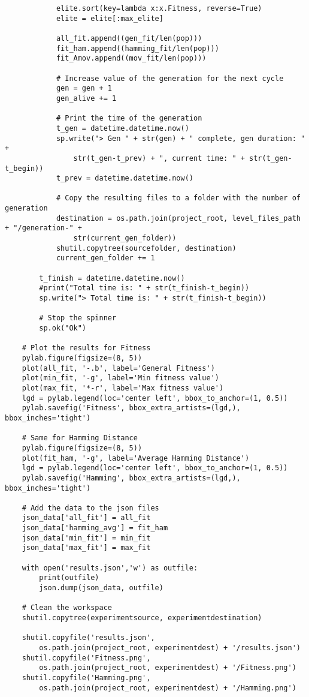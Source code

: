 \begin{verbatim}
            elite.sort(key=lambda x:x.Fitness, reverse=True)
            elite = elite[:max_elite]

            all_fit.append((gen_fit/len(pop)))
            fit_ham.append((hamming_fit/len(pop)))
            fit_Amov.append((mov_fit/len(pop)))
            
            # Increase value of the generation for the next cycle
            gen = gen + 1
            gen_alive += 1

            # Print the time of the generation
            t_gen = datetime.datetime.now()
            sp.write("> Gen " + str(gen) + " complete, gen duration: " + 
                str(t_gen-t_prev) + ", current time: " + str(t_gen-t_begin))
            t_prev = datetime.datetime.now()

            # Copy the resulting files to a folder with the number of generation
            destination = os.path.join(project_root, level_files_path + "/generation-" + 
                str(current_gen_folder))
            shutil.copytree(sourcefolder, destination)
            current_gen_folder += 1

        t_finish = datetime.datetime.now()
        #print("Total time is: " + str(t_finish-t_begin))
        sp.write("> Total time is: " + str(t_finish-t_begin))

        # Stop the spinner
        sp.ok("Ok")
        
    # Plot the results for Fitness
    pylab.figure(figsize=(8, 5))
    plot(all_fit, '-.b', label='General Fitness')
    plot(min_fit, '-g', label='Min fitness value')
    plot(max_fit, '*-r', label='Max fitness value')
    lgd = pylab.legend(loc='center left', bbox_to_anchor=(1, 0.5))
    pylab.savefig('Fitness', bbox_extra_artists=(lgd,), bbox_inches='tight')

    # Same for Hamming Distance
    pylab.figure(figsize=(8, 5))
    plot(fit_ham, '-g', label='Average Hamming Distance')
    lgd = pylab.legend(loc='center left', bbox_to_anchor=(1, 0.5))
    pylab.savefig('Hamming', bbox_extra_artists=(lgd,), bbox_inches='tight')

    # Add the data to the json files
    json_data['all_fit'] = all_fit
    json_data['hamming_avg'] = fit_ham
    json_data['min_fit'] = min_fit
    json_data['max_fit'] = max_fit

    with open('results.json','w') as outfile:
        print(outfile)
        json.dump(json_data, outfile)

    # Clean the workspace
    shutil.copytree(experimentsource, experimentdestination)

    shutil.copyfile('results.json',
        os.path.join(project_root, experimentdest) + '/results.json')
    shutil.copyfile('Fitness.png',
        os.path.join(project_root, experimentdest) + '/Fitness.png')
    shutil.copyfile('Hamming.png',
        os.path.join(project_root, experimentdest) + '/Hamming.png')
    \end{verbatim}


